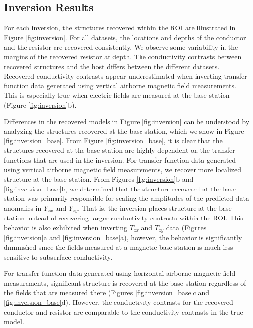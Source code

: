 \documentclass{segabs}
\begin{document}
\subsection{Inversion Results}

For each inversion, the structures recovered within the ROI are illustrated in Figure \ref{fig:inversion}. For all datasets, the locations and depths of the conductor and the resistor are recovered consistently. We observe some variability in the margins of the recovered resistor at depth. The conductivity contrasts between recovered structures and the host differs between the different datasets. Recovered conductivity contrasts appear underestimated when inverting transfer function data generated using vertical airborne magnetic field measurements. This is especially true when electric fields are measured at the base station (Figure \ref{fig:inversion}b).

Differences in the recovered models in Figure \ref{fig:inversion} can be understood by analyzing the structures recovered at the base station, which we show in Figure \ref{fig:inversion_base}. From Figure \ref{fig:inversion_base}, it is clear that the structures recovered at the base station are highly dependent on the transfer functions that are used in the inversion. For transfer function data generated using vertical airborne magnetic field measurements, we recover more localized structure at the base station. From Figures \ref{fig:inversion}b and \ref{fig:inversion_base}b, we determined that the structure recovered at the base station was primarily responsible for scaling the amplitudes of the predicted data anomalies in $Y_{zx}$ and $Y_{zy}$. That is, the inversion places structure at the base station instead of recovering larger conductivity contrasts within the ROI. This behavior is also exhibited when inverting $T_{zx}$ and $T_{zy}$ data (Figures \ref{fig:inversion}a and \ref{fig:inversion_base}a), however, the behavior is significantly diminished since the fields measured at a magnetic base station is much less sensitive to subsurface conductivity.

For transfer function data generated using horizontal airborne magnetic field measurements, significant structure is recovered at the base station regardless of the fields that are measured there (Figures \ref{fig:inversion_base}c and \ref{fig:inversion_base}d). However, the conductivity contrasts for the recovered conductor and resistor are comparable to the conductivity contrasts in the true model.
\vspace{-10pt}
\end{document}
